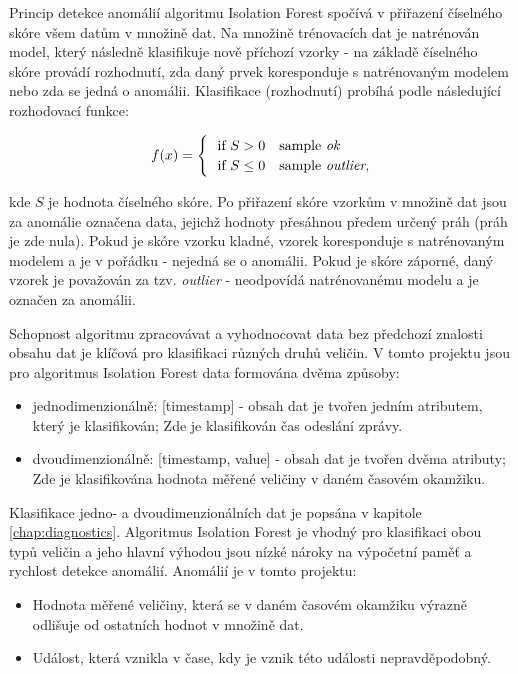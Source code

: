 Princip detekce anomálií algoritmu Isolation Forest spočívá v přiřazení číselného skóre všem datům v množině dat. Na množině trénovacích dat je natrénován model, který následně klasifikuje nově příchozí vzorky - na základě číselného skóre provádí rozhodnutí, zda daný prvek koresponduje s natrénovaným modelem nebo zda se jedná o anomálii. Klasifikace (rozhodnutí) probíhá podle následující rozhodovací funkce:

\[
    f(x)= 
\begin{cases}
     \ \ \text{if } S > 0 & \text{sample \textit{ok}}\\
     \ \ \text{if } S \leq 0 & \text{sample \textit{outlier},}\\
\end{cases}
\]

kde $S$ je hodnota číselného skóre. Po přiřazení skóre vzorkům v množině dat jsou za anomálie označena data, jejichž hodnoty přesáhnou předem určený práh (práh je zde nula). Pokud je skóre vzorku kladné, vzorek koresponduje s natrénovaným modelem a je v pořádku - nejedná se o anomálii. Pokud je skóre záporné, daný vzorek je považován za tzv. \textit{outlier} - neodpovídá natrénovanému modelu a je označen za anomálii. \par
Schopnost algoritmu zpracovávat a vyhodnocovat data bez předchozí znalosti obsahu dat je klíčová pro klasifikaci různých druhů veličin. V tomto projektu jsou pro algoritmus Isolation Forest data formována dvěma způsoby: 

\begin{itemize}
	\item jednodimenzionálně: [timestamp] - obsah dat je tvořen jedním atributem, který je klasifikován; Zde je klasifikován čas odeslání zprávy. 
	\item dvoudimenzionálně: [timestamp, value] - obsah dat je tvořen dvěma atributy; Zde je klasifikována hodnota měřené veličiny v daném časovém okamžiku.
\end{itemize}

Klasifikace jedno- a dvoudimenzionálních dat je popsána v kapitole \cref{chap:diagnostics}. Algoritmus Isolation Forest je vhodný pro klasifikaci obou typů veličin a jeho hlavní výhodou jsou nízké nároky na výpočetní paměť a rychlost detekce anomálií.  Anomálií je v tomto projektu:

\begin{itemize}
	\item Hodnota měřené veličiny, která se v daném časovém okamžiku výrazně odlišuje od ostatních hodnot v množině dat.
	\item Událost, která vznikla v čase, kdy je vznik této události nepravděpodobný. 
\end{itemize}

